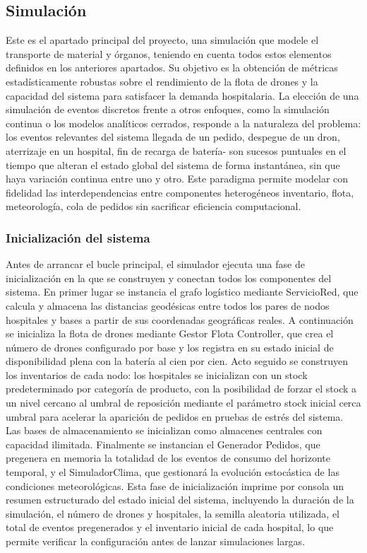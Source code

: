 \documentclass[11pt, a4paper]{article} %
\begin{document}
\subsection{Simulación}
Este es el apartado principal del proyecto, una simulación que modele el transporte de material y órganos, teniendo en cuenta todos estos elementos definidos en los anteriores apartados. Su objetivo es la obtención de métricas estadísticamente robustas sobre el rendimiento de la flota de drones y la capacidad del sistema para satisfacer la demanda hospitalaria. La elección de una simulación de eventos discretos frente a otros enfoques, como la simulación continua o los modelos analíticos cerrados, responde a la naturaleza del problema: los eventos relevantes del sistema llegada de un pedido, despegue de un dron, aterrizaje en un hospital, fin de recarga de batería- son sucesos puntuales en el tiempo que alteran el estado global del sistema de forma instantánea, sin que haya variación continua entre uno y otro. Este paradigma permite modelar con fidelidad las interdependencias entre componentes heterogéneos inventario, flota, meteorología, cola de pedidos sin sacrificar eficiencia computacional.

\subsubsection{Inicialización del sistema}
Antes de arrancar el bucle principal, el simulador ejecuta una fase de inicialización en la que se construyen y conectan todos los componentes del sistema. En primer lugar se instancia el grafo logístico mediante ServicioRed, que calcula y almacena las distancias geodésicas entre todos los pares de nodos hospitales y bases a partir de sus coordenadas geográficas reales. A continuación se inicializa la flota de drones mediante Gestor Flota Controller, que crea el número de drones configurado por base y los registra en su estado inicial de disponibilidad plena con la batería al cien por cien. Acto seguido se construyen los inventarios de cada nodo: los hospitales se inicializan con un stock predeterminado por categoría de producto, con la posibilidad de forzar el stock a un nivel cercano al umbral de reposición mediante el parámetro stock inicial cerca umbral para acelerar la aparición de pedidos en pruebas de estrés del sistema. Las bases de almacenamiento se inicializan como almacenes centrales con capacidad ilimitada. Finalmente se instancian el Generador Pedidos, que pregenera en memoria la totalidad de los eventos de consumo del horizonte temporal, y el SimuladorClima, que gestionará la evolución estocástica de las condiciones meteorológicas. Esta fase de inicialización imprime por consola un resumen estructurado del estado inicial del sistema, incluyendo la duración de la simulación, el número de drones y hospitales, la semilla aleatoria utilizada, el total de eventos pregenerados y el inventario inicial de cada hospital, lo que permite verificar la configuración antes de lanzar simulaciones largas.
\end{document}
